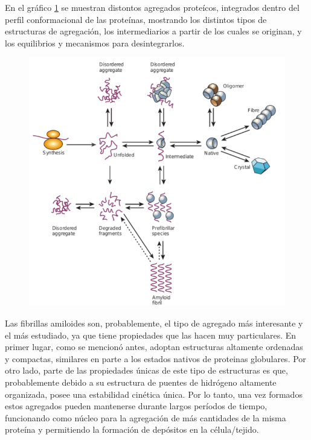En el gráfico \ref{aggregationDiagram} se muestran distontos agregados proteícos, integrados dentro del perfil conformacional de las proteínas, mostrando los distintos tipos de estructuras de agregación, 
los intermediarios a partir de los cuales se originan, y los equilibrios y mecanismos para desintegrarlos. 


\begin{figure}[h!,centered]
\includegraphics[width=\textwidth]{img/aggregationDiagram.png} 
\caption{} \label{aggregationDiagram}
\end{figure}



Las fibrillas amiloides son, probablemente, el tipo de agregado más interesante y el más estudiado, ya que tiene propiedades que las hacen muy particulares.
En primer lugar, como se mencionó antes, adoptan estructuras altamente ordenadas y compactas, similares en parte a los estados nativos de proteinas globulares.
Por otro lado, parte de las propiedades únicas de este tipo de estructuras es que, probablemente debido a su estructura de puentes de hidrógeno altamente organizada, posee una estabilidad cinética única.
Por lo tanto, una vez formados estos agregados pueden mantenerse durante largos períodos de tiempo, funcionando como núcleo para la agregación de más cantidades de la misma proteína 
y permitiendo la formación de depósitos en la célula/tejido.

